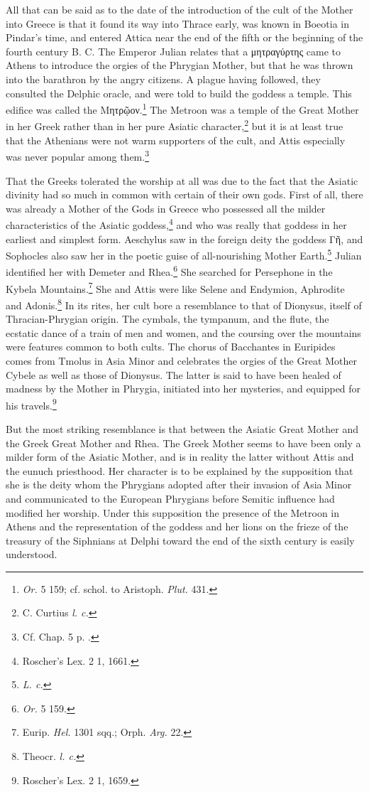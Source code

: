 \documentclass[a4paper, 11pt, oneside, polutonikogreek, english]{article}
\begin{document}
All that can be said as to the date of the introduction of the cult of the Mother into Greece is that it found its way into Thrace early, was known in Boeotia in Pindar's time, and entered Attica near the end of the fifth or the beginning of the fourth century B. C. The Emperor Julian relates that a μητραγύρτης came to Athens to introduce the orgies of the Phrygian Mother, but that he was thrown into the barathron by the angry citizens. A plague having followed, they consulted the Delphic oracle, and were told to build the goddess a temple. This edifice was called the Μητρῷον.\footnote{\emph{Or.} 5 159; cf. schol. to Aristoph. \emph{Plut.} 431.} The Metroon was a temple of the Great Mother in her Greek rather than in her pure Asiatic character,\footnote{C. Curtius \emph{l. c.}} but it is at least true that the Athenians were not warm supporters of the cult, and Attis especially was never popular among them.\footnote{Cf. Chap. 5 p. .}

That the Greeks tolerated the worship at all was due to the fact that the Asiatic divinity had so much in common with certain of their own gods. First of all, there was already a Mother of the Gods in Greece who possessed all the milder characteristics of the Asiatic goddess,\footnote{Roscher's Lex. 2 1, 1661.} and who was really that goddess in her earliest and simplest form. Aeschylus saw in the foreign deity the goddess Γῆ, and Sophocles also saw her in the poetic guise of all-nourishing Mother Earth.\footnote{\emph{L. c.}} Julian identified her with Demeter and Rhea.\footnote{\emph{Or.} 5 159.} She searched for Persephone in the Kybela Mountains.\footnote{Eurip. \emph{Hel.} 1301 sqq.; Orph. \emph{Arg.} 22.} She and Attis were like Selene and Endymion, Aphrodite and Adonis.\footnote{Theocr. \emph{l. c.}} In its rites, her cult bore a resemblance to that of Dionysus, itself of Thracian-Phrygian origin. The cymbals, the tympanum, and the flute, the ecstatic dance of a train of men and women, and the coursing over the mountains were features common to both cults. The chorus of Bacchantes in Euripides comes from Tmolus in Asia Minor and celebrates the orgies of the Great Mother Cybele as well as those of Dionysus. The latter is said to have been healed of madness by the Mother in Phrygia, initiated into her mysteries, and equipped for his travels.\footnote{Roscher's Lex. 2 1, 1659.}

But the most striking resemblance is that between the Asiatic Great Mother and the Greek Great Mother and Rhea. The Greek Mother seems to have been only a milder form of the Asiatic Mother, and is in reality the latter without Attis and the eunuch priesthood. Her character is to be explained by the supposition that she is the deity whom the Phrygians adopted after their invasion of Asia Minor and communicated to the European Phrygians before Semitic influence had modified her worship. Under this supposition the presence of the Metroon in Athens and the representation of the goddess and her lions on the frieze of the treasury of the Siphnians at Delphi toward the end of the sixth century is easily understood.
\end{document}
